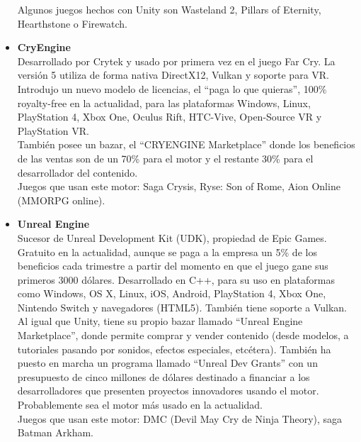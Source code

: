 \begin{itemize}
\quad Algunos juegos hechos con Unity son Wasteland 2, Pillars of Eternity, Hearthstone o Firewatch.\\ 

\item{\textbf{CryEngine}}\\

\quad Desarrollado por Crytek y usado por primera vez en el juego Far Cry. La versión 5 utiliza de forma nativa DirectX12, Vulkan y soporte para VR.\\  

\quad Introdujo un nuevo modelo de licencias, el “paga lo que quieras”, 100\% royalty-free en la actualidad, para las plataformas Windows, Linux, PlayStation 4, Xbox One, Oculus Rift, HTC-Vive, Open-Source VR y PlayStation VR.\\ 

\quad También posee un bazar, el “CRYENGINE Marketplace” donde los beneficios de las ventas son de un 70\% para el motor y el restante 30\% para el desarrollador del contenido.\\

\quad Juegos que usan este motor: Saga Crysis, Ryse: Son of Rome, Aion Online (MMORPG online).\\

\item{\textbf{Unreal Engine}}\\

\quad Sucesor de Unreal Development Kit (UDK), propiedad de Epic Games. Gratuito en la actualidad, aunque se paga a la empresa un 5\% de los beneficios cada trimestre a partir del momento en que el juego gane sus primeros 3000 dólares. Desarrollado en C++, para su uso en plataformas como Windows, OS X, Linux, iOS, Android, PlayStation 4, Xbox One, Nintendo Switch y navegadores (HTML5). También tiene soporte a Vulkan.\\

\quad Al igual que Unity, tiene su propio bazar llamado “Unreal Engine Marketplace”, donde permite comprar y vender contenido (desde modelos, a tutoriales pasando por sonidos, efectos especiales, etcétera). También ha puesto en marcha un programa llamado “Unreal Dev Grants” con un presupuesto de cinco millones de dólares destinado a financiar a los desarrolladores que presenten proyectos innovadores usando el motor. Probablemente sea el motor más usado en la actualidad.\\

\quad Juegos que usan este motor: DMC (Devil May Cry de Ninja Theory), saga Batman Arkham.\\


\end{itemize}
